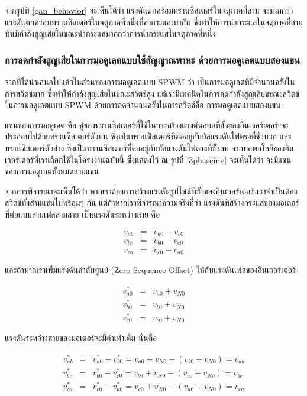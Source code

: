 \documentclass[11pt,a4paper]{article}
\begin{document}
จากรูปที่ \ref{gan_behavior} จะเห็นได้ว่า แรงดันตกคร่อมทรานซิสเตอร์ในจตุภาคที่สาม จะมากกว่าแรงดันตกคร่อมทรานซิสเตอร์ในจตุภาคที่หนึ่งที่ค่ากระแสเท่ากัน ซึ่งทำให้การนำกระแสในจตุภาคที่สามนั้นมีกำลังสูญเสียในขณะนำกระแสมากกว่าการนำกระแสในจตุภาคที่หนึ่ง

\subsubsection{การลดกำลังสูญเสียในการมอดูเลตแบบใช้สัญญาณพาหะ ด้วยการมอดูเลตแบบสองแขน}

จากที่ได้นำเสนอไปแล้วในส่วนของการมอดูเลตแบบ SPWM ว่า เป็นการมอดูเลตที่มีจำนวนครั้งในการสวิตช์มาก ซึ่งทำให้กำลังสูญเสียในขณะสวิตช์สูง แต่เรามีเทคนิคในการลดกำลังสูญเสียขขณะสวิตช์ในการมอดูเลตแบบ SPWM ด้วยการลดจำนวนครั้งในการสวิตช์คือ การมอดูเลตแบบสองแขน

แขนของการมอดูเลต คือ คู่ของทรานซิสเตอร์ที่ใช้ในการสร้างแรงดันออกที่ขั้วของอินเวอร์เตอร์ จะประกอบไปด้วยทรานซิสเตอร์ตัวบน ซึ่งเป็นทรานซิสเตอร์ที่ต่ออยู่กับบัสแรงดันไฟตรงที่ขั้วบวก และทรานซิสเตอร์ตัวล่าง ซึ่งเป็นทรานซิสเตอร์ที่ต่ออยู่กับบัสแรงดันไฟตรงที่ขั้วลบ จากทอพอโลยีของอินเวอร์เตอร์ที่เราเลือกใช้ในโครงงานฉบับนี้ ซึ่งแสดงไว้ ณ รูปที่ \ref{3phaseinv} จะเห็นได้ว่า จะมีแขนของการมอดูเลตทั้งหมดสามแขน

จากการพิจารณาจะเห็นได้ว่า หากเราต้องการสร้างแรงดันรูปไซน์ที่ขั้วของอินเวอร์เตอร์ เราจำเป็นต้องสวิตช์ทั้งสามแขนไปพร้อมๆ กัน แต่ถ้าหากเราพิจารณาความจริงที่ว่า แรงดันที่สร้างกระแสของมอเตอร์ที่ต่อแบบสามเฟสสามสาย เป็นแรงดันระหว่างสาย คือ

\begin{eqnarray}
    v_{ab} &=& v_{a0} - v_{b0} \\
    v_{bc} &=& v_{b0} - v_{c0} \\
    v_{ca} &=& v_{c0} - v_{a0}
\end{eqnarray}

และถ้าหากเราเพิ่มแรงดันลำดับศูนย์ (Zero Sequence Offset) ให้กับแรงดันเฟสของอินเวอร์เตอร์

\begin{eqnarray}
    v_{a0}^* &=& v_{a0} + v_{N0} \\
    v_{b0}^* &=& v_{b0} + v_{N0} \\
    v_{c0}^* &=& v_{c0} + v_{N0}
\end{eqnarray}

แรงดันระหว่างสายของมอเตอร์จะมีค่าเท่าเดิม นั่นคือ

\begin{eqnarray}
    v_{ab}^* &=& v_{a0}^* - v_{b0}^* = v_{a0} + v_{N0} - (v_{b0} + v_{N0}) = v_{ab} \\
    v_{bc}^* &=& v_{b0}^* - v_{c0}^* = v_{b0} + v_{N0} - (v_{c0} + v_{N0}) = v_{bc} \\
    v_{ca}^* &=& v_{c0}^* - v_{a0}^* = v_{c0} + v_{N0} - (v_{a0} + v_{N0}) = v_{ca}
\end{eqnarray}
\end{document}
